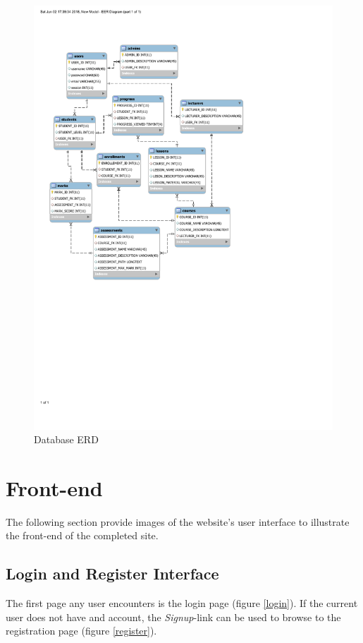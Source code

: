 \documentclass[a4paper,12pt]{article}
\numberwithin{equation}{section} %
\numberwithin{figure}{section}
\begin{document}
\begin{figure}[H]
\centering
\includegraphics[scale = 0.95,trim = {0 10cm 6cm 2.5cm},clip]{./images/model.pdf} %
\caption{Database ERD}
\label{model}
\end{figure}

\section{Front-end}
The following section provide images of the website's user interface to illustrate the front-end of the completed site.
\subsection{Login and Register Interface}
The first page any user encounters is the login page (figure \ref{login}). If the current user does not have and account, the \textit{Signup}-link can be used to browse to the registration page (figure \ref{register}).
\end{document}
